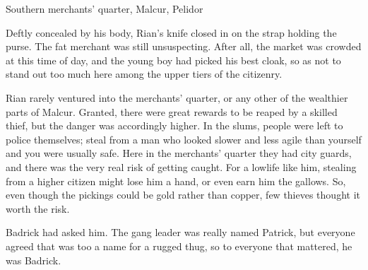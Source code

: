 \begin{comment}
\section{What Slithers Beneath}
\end{comment}


\begin{comment}
\subsection{Rian}
\end{comment}

\stamp
  {\dateIshnaruchaefirSlaysAGhobal}
  {Southern merchants' quarter, Malcur, Pelidor}
%

Deftly concealed by his body, Rian's knife closed in on the strap holding the purse. The fat merchant was still unsuspecting. After all, the market was crowded at this time of day, and the young boy had picked his best cloak, so as not to stand out too much here among the upper tiers of the citizenry. 

Rian rarely ventured into the merchants' quarter, or any other of the wealthier parts of Malcur. Granted, there were great rewards to be reaped by a skilled thief, but the danger was accordingly higher. In the slums, people were left to police themselves; steal from a man who looked slower and less agile than yourself and you were usually safe. Here in the merchants' quarter they had city guards, and there was the very real risk of getting caught. For a lowlife like him, stealing from a higher citizen might lose him a hand, or even earn him the gallows. So, even though the pickings could be gold rather than copper, few thieves thought it worth the risk.

 Badrick had asked him. 
The gang leader was really named Patrick, but everyone agreed that was too  a name for a rugged thug, so to everyone that mattered, he was Badrick. 

